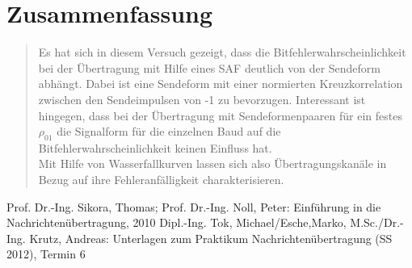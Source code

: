 \section{Zusammenfassung}
\begin{quote}
	
	Es hat sich in diesem Versuch gezeigt, dass die Bitfehlerwahrscheinlichkeit bei der Übertragung mit Hilfe eines SAF
	deutlich von der Sendeform abhängt. Dabei ist eine Sendeform mit einer normierten Kreuzkorrelation zwischen den
	Sendeimpulsen von -1 zu bevorzugen. Interessant ist hingegen, dass bei der Übertragung mit Sendeformenpaaren
	für ein festes $\rho_{01}$ die Signalform für die einzelnen Baud auf die Bitfehlerwahrscheinlichkeit keinen Einfluss
	hat.\\
	Mit Hilfe von Wasserfallkurven lassen sich also Übertragungskanäle in Bezug auf ihre Fehleranfälligkeit
	charakterisieren.
 
    
\end{quote} %



\newpage

\begin{thebibliography}{999}




 Prof. Dr.-Ing. Sikora, Thomas; Prof. Dr.-Ing. Noll, Peter: Einführung in die
Nachrichtenübertragung, 2010
 Dipl.-Ing. Tok, Michael/Esche,Marko, M.Sc./Dr.-Ing. Krutz, Andreas: Unterlagen zum Praktikum
Nachrichtenübertragung (SS 2012), Termin 6
\end{thebibliography}


